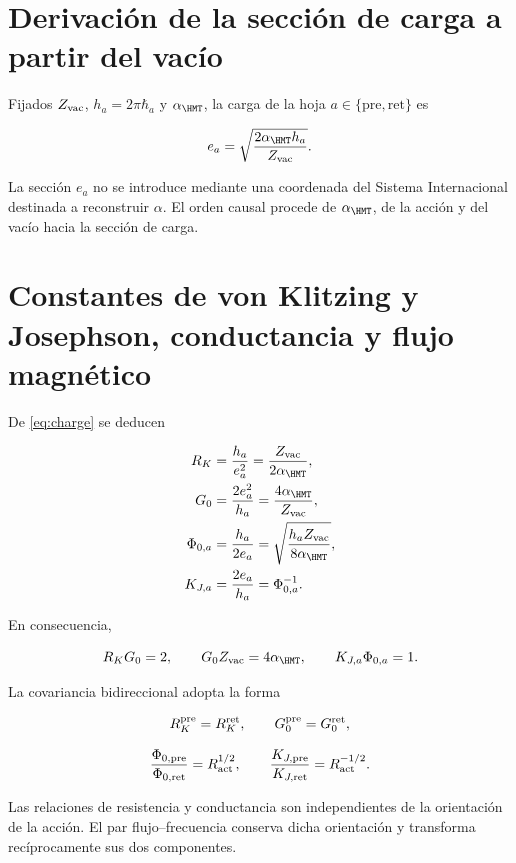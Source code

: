 \label{ch:metrology}

\section{Derivaci\'on de la secci\'on de carga a partir del vac\'io}

Fijados \(Z_{\rm vac}\), \(h_a=2\pi\hbar_a\) y \(\alpha_{\HMT}\), la carga de la hoja \(a\in\{\mathrm{pre},\mathrm{ret}\}\) es

\begin{equation}
e_a=\sqrt{\frac{2\alpha_{\HMT}h_a}{Z_{\rm vac}}}.
\label{eq:charge}
\end{equation}

La secci\'on \(e_a\) no se introduce mediante una coordenada del Sistema
Internacional destinada a reconstruir \(\alpha\). El orden causal procede de
\(\alpha_{\HMT}\), de la acci\'on y del vac\'io hacia la secci\'on de carga.

\section{Constantes de von Klitzing y Josephson, conductancia y flujo magn\'etico}

De \cref{eq:charge} se deducen

\begin{align}
R_K&=\frac{h_a}{e_a^2}=\frac{Z_{\rm vac}}{2\alpha_{\HMT}},
\label{eq:rk}\\
G_0&=\frac{2e_a^2}{h_a}=\frac{4\alpha_{\HMT}}{Z_{\rm vac}},
\label{eq:g0}\\
\Phi_{0,a}&=\frac{h_a}{2e_a}
=\sqrt{\frac{h_aZ_{\rm vac}}{8\alpha_{\HMT}}},
\label{eq:phi0}\\
K_{J,a}&=\frac{2e_a}{h_a}=\Phi_{0,a}^{-1}.
\label{eq:kj}
\end{align}

En consecuencia,

\begin{equation}
R_KG_0=2,\qquad G_0Z_{\rm vac}=4\alpha_{\HMT},
\qquad K_{J,a}\Phi_{0,a}=1.
\label{eq:quantum-electrical-identities}
\end{equation}

La covariancia bidireccional adopta la forma

\[
R_K^{\rm pre}=R_K^{\rm ret},\qquad
G_0^{\rm pre}=G_0^{\rm ret},
\]

\[
\frac{\Phi_{0,\rm pre}}{\Phi_{0,\rm ret}}=R_{\rm act}^{1/2},
\qquad
\frac{K_{J,\rm pre}}{K_{J,\rm ret}}=R_{\rm act}^{-1/2}.
\]

Las relaciones de resistencia y conductancia son independientes de la
orientaci\'on de la acci\'on. El par flujo--frecuencia conserva dicha
orientaci\'on y transforma rec\'iprocamente sus dos componentes.

